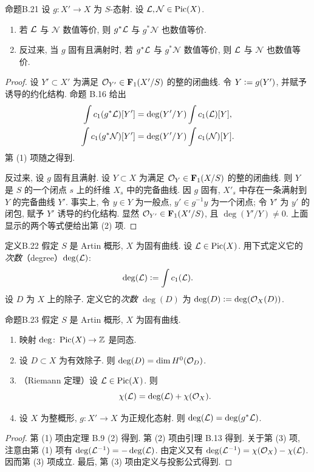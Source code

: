 \begin{origstatement}{命题}{B.21}\label{appB:21}
设 $g\colon X'\to X$ 为 $S$-态射. 设 $\mathcal L,\mathcal N\in\operatorname{Pic}(X)$.
\begin{enumerate}[label=(\arabic*)]
\item 若 $\mathcal L$ 与 $\mathcal N$ 数值等价, 则 $g^*\mathcal L$ 与 $g^*\mathcal N$ 也数值等价.
\item 反过来, 当 $g$ 固有且满射时, 若 $g^*\mathcal L$ 与 $g^*\mathcal N$ 数值等价, 则 $\mathcal L$ 与 $\mathcal N$ 也数值等价.
\end{enumerate}
\end{origstatement}
\begin{proof}
设 $Y'\subset X'$ 为满足 $\mathcal O_{Y'}\in\mathbf F_1(X'/S)$ 的整的闭曲线. 令 $Y\mathrel{\mathop:}= g(Y')$, 并赋予诱导的约化结构. 命题 B.16 给出
\begin{align*}
\int c_1(g^*\mathcal L)[Y']&=\deg(Y'/Y)\int c_1(\mathcal L)[Y],\\
\int c_1(g^*\mathcal N)[Y']&=\deg(Y'/Y)\int c_1(\mathcal N)[Y].
\end{align*}
第 (1) 项随之得到.

反过来, 设 $g$ 固有且满射. 设 $Y\subset X$ 为满足 $\mathcal O_Y\in\mathbf F_1(X/S)$ 的整的闭曲线. 则 $Y$ 是 $S$ 的一个闭点 $s$ 上的纤维 $X_s$ 中的完备曲线. 因 $g$ 固有, $X'_s$ 中存在一条满射到 $Y$ 的完备曲线 $Y'$. 事实上, 令 $y\in Y$ 为一般点, $y'\in g^{-1}y$ 为一个闭点; 令 $Y'$ 为 $y'$ 的闭包, 赋予 $Y'$ 诱导的约化结构. 显然 $\mathcal O_{Y'}\in\mathbf F_1(X'/S)$, 且 $\deg(Y'/Y)\ne0$. 上面显示的两个等式便给出第 (2) 项.
\end{proof}

\begin{origstatement}{定义}{B.22}\label{appB:22}
假定 $S$ 是 Artin 概形, $X$ 为固有曲线. 设 $\mathcal L\in\operatorname{Pic}(X)$. 用下式定义它的\emph{次数}（degree）$\deg(\mathcal L)$:
\[\deg(\mathcal L)\mathrel{\mathop:}=\int c_1(\mathcal L).\]
设 $D$ 为 $X$ 上的除子. 定义它的\emph{次数} $\deg(D)$ 为 $\deg(D)\mathrel{\mathop:}=\deg(\mathcal O_X(D))$.
\end{origstatement}

\begin{origstatement}{命题}{B.23}\label{appB:23}
假定 $S$ 是 Artin 概形, $X$ 为固有曲线.
\begin{enumerate}[label=(\arabic*)]
\item 映射 $\deg\colon\operatorname{Pic}(X)\to\mathbb Z$ 是同态.
\item 设 $D\subset X$ 为有效除子. 则 $\deg(D)=\dim H^0(\mathcal O_D)$.
\item （Riemann 定理）设 $\mathcal L\in\operatorname{Pic}(X)$. 则
\[\chi(\mathcal L)=\deg(\mathcal L)+\chi(\mathcal O_X).\]
\item 设 $X$ 为整概形, $g\colon X'\to X$ 为正规化态射. 则 $\deg(\mathcal L)=\deg(g^*\mathcal L)$.
\end{enumerate}
\end{origstatement}
\begin{proof}
第 (1) 项由定理 B.9 (2) 得到. 第 (2) 项由引理 B.13 得到. 关于第 (3) 项, 注意由第 (1) 项有 $\deg(\mathcal L^{-1})=-\deg(\mathcal L)$. 由定义又有 $\deg(\mathcal L^{-1})=\chi(\mathcal O_X)-\chi(\mathcal L)$. 因而第 (3) 项成立. 最后, 第 (3) 项由定义与投影公式得到.
\end{proof}

